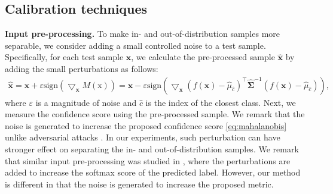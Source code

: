 \documentclass{article}
\begin{document}
\subsection{Calibration techniques}


{\bf Input pre-processing.}
To make in- and out-of-distribution samples more separable, we consider adding a small controlled noise to a test sample.
Specifically, for each test sample $\mathbf{x}$, we calculate the pre-processed sample $\mathbf{\widehat x}$ by adding the small perturbations as follows:
\begin{align} \label{eq:input_pre}
\mathbf{\widehat  x} = \mathbf{x} + \varepsilon \text{sign} \left( \bigtriangledown_{\mathbf{x}} M(\mathrm{x}) \right)
 = \mathbf{x} - \varepsilon \text{sign} \left( \bigtriangledown_{\mathbf{x}}
 \left( f(\mathbf{x}) - {\widehat \mu}_{\widehat c}\right)^\top \mathbf{\widehat \Sigma}^{-1} \left( f(\mathbf{x}) - {\widehat \mu}_{\widehat c}\right)  \right),
\end{align}
where $\varepsilon$ is a magnitude of noise and $\widehat c$ is the index of the closest class.
Next, we measure the confidence score using the pre-processed sample.
We remark that the noise is generated to increase the proposed confidence score \eqref{eq:mahalanobis} unlike adversarial attacks \citep{goodfellow2014explaining}.
In our experiments,
such perturbation can have stronger effect on separating the in- and out-of-distribution samples.
We remark that similar input pre-processing was studied in \citep{liang2017principled}, where the perturbations are added to increase the softmax score of the predicted label.
However, our method is different in that the noise is generated to increase the proposed metric.
\end{document}
